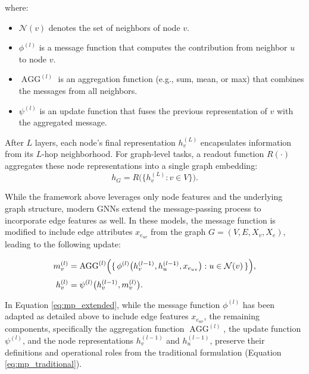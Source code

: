 \documentclass[journal]{IEEEtran}
\begin{document}
where:
\begin{itemize}
    \item $\mathcal{N}(v)$ denotes the set of neighbors of node $v$.
    \item $\phi^{(l)}$ is a message function that computes the contribution from neighbor $u$ to node $v$.
    \item $\operatorname{AGG}^{(l)}$ is an aggregation function (e.g., sum, mean, or max) that combines the messages from all neighbors.
    \item $\psi^{(l)}$ is an update function that fuses the previous representation of $v$ with the aggregated message.
\end{itemize}

After $L$ layers, each node’s final representation $h_v^{(L)}$ encapsulates information from its $L$-hop neighborhood. For graph-level tasks, a readout function $R(\cdot)$ aggregates these node representations into a single graph embedding:
\begin{equation}
    h_G = R\bigl(\{h_v^{(L)} : v \in V\}\bigr).
\end{equation}

While the framework above leverages only node features and the underlying graph structure, modern GNNs extend the message-passing process to incorporate edge features as well. In these models, the message function is modified to include edge attributes $x_{e_{uv}}$ from the graph $G = (V, E, X_v, X_e)$, leading to the following update:

\begin{equation}
\label{eq:mp_extended}
    \begin{aligned}
    m_v^{(l)} &= \operatorname{AGG}^{(l)}\Bigl(\{\, \phi^{(l)}\bigl(h_v^{(l-1)}, h_u^{(l-1)}, x_{e_{uv}}\bigr) : u \in \mathcal{N}(v)\,\}\Bigr),\\[1mm]
    h_v^{(l)} &= \psi^{(l)}\bigl(h_v^{(l-1)}, m_v^{(l)}\bigr).
    \end{aligned}
\end{equation}

In Equation \ref{eq:mp_extended}, while the message function $\phi^{(l)}$ has been adapted as detailed above to include edge features $x_{e_{uv}}$, the remaining components, specifically the aggregation function $\operatorname{AGG}^{(l)}$, the update function $\psi^{(l)}$, and the node representations $h_v^{(l-1)}$ and $h_u^{(l-1)}$, preserve their definitions and operational roles from the traditional formulation (Equation \ref{eq:mp_traditional}).
\end{document}
